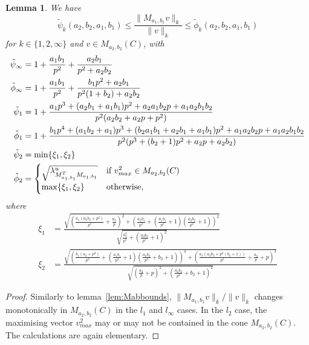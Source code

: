 \documentclass{iopart}
\newtheorem{lemma}{Lemma}
\begin{document}
\begin{lemma}\label{lem:better_Mabbounds}
We have
$$
\tilde{\psi}_k (a_2,b_2,a_1,b_1) \le \frac{\| M_{a_1,b_1} v  \|_k}{\| v  \|_k} \le \tilde{\phi}_k (a_2,b_2,a_1,b_1)
$$
for $k \in \{ 1,2,\infty \}$ and $v \in M_{a_2,b_2} (C)$, with
\begin{align*}
\tilde{\psi}_{\infty} &= 1+\frac{a_1 b_1}{p^2} + \frac{a_2 b_1}{p^2 + a_2b_2}\\
\tilde{\phi}_{\infty} &= 1+\frac{a_1 b_1}{p^2} + \frac{b_1 p^2+a_2 b_1}{p^2(1+b_2) + a_2 b_2}\\
\tilde{\psi}_{1} &= 1+\frac{a_1p^3+(a_2b_1+a_1b_1)p^2+a_2a_1b_2p+a_1a_2b_1b_2}{p^2(a_2b_2+a_2p+p^2)}\\
\tilde{\phi}_{1} &= 1+\frac{b_1p^4+(a_1b_2+a_1)p^3+(b_2a_1b_1+a_2b_1+a_1b_1)p^2+a_1a_2b_2p+a_1a_2b_1b_2}{p^2(p^3+(b_2+1)p^2+a_2p+a_2b_2)} \\
\tilde{\psi}_2 &= \min \{ \xi_1,\xi_2  \}   \\
\tilde{\phi}_2 &=   \begin{cases} \sqrt{\lambda_{M_{a_1,b_1}^T M_{a_1,b_1}}^{u}}  & \mbox{if  $ v_{max}^2 \in M_{a_2,b_2} (C)$} \\
\max \{ \xi_1,\xi_2 \}  & \mbox{otherwise},
\end{cases}
\end{align*}
where
\begin{align*}
\xi_1 &=   \frac{\sqrt{\left(\frac{a_{1} \left(a_{2} b_{2} + p^2\right)}{p^3} + \frac{a_{2}}{p}\right)^{2} + \left(\frac{a_{2} b_{1}}{p^{2}} + \left(\frac{a_{1} b_{1}}{p^{2}} + 1\right) \left(\frac{a_{2} b_{2}}{p^{2}} + 1\right)\right)^{2}}}{\sqrt{\frac{a_{2}^{2}}{p^{2}} + \left(\frac{a_{2} b_{2}}{p^{2}} + 1\right)^{2}}} \\
\xi_2 &= \frac{\sqrt{\left(\frac{b_{1} \left(a_{2} + p^2\right)}{p^2} + \left(\frac{a_{1} b_{1}}{p^{2}} + 1\right) \left(\frac{a_{2} b_{2}}{p^{2}} + b_{2} + 1\right)\right)^{2} + \left(\frac{a_{1} \left(a_{2} b_{2} + p^2(b_{2} + 1)\right)}{p^3} + \frac{a_{2}}{p} + p\right)^{2}}}{\sqrt{\left(\frac{a_{2}}{p} + p\right)^{2} + \left(\frac{a_{2} b_{2}}{p^{2}} + b_{2} + 1\right)^{2}}}
\end{align*}
\end{lemma}

\begin{proof}
Similarly to lemma~\ref{lem:Mabbounds}, $\| M_{a_1,b_1} v  \|_k/\| v  \|_k$ changes monotonically in $M_{a_2,b_2} (C)$ in the $l_1$ and $l_{\infty}$ cases. In the $l_2$ case, the maximising vector $ v_{max}^2 $ may or may not be contained in the cone $M_{a_2,b_2} (C)$. The calculations are again elementary. 
\end{proof}
\end{document}
